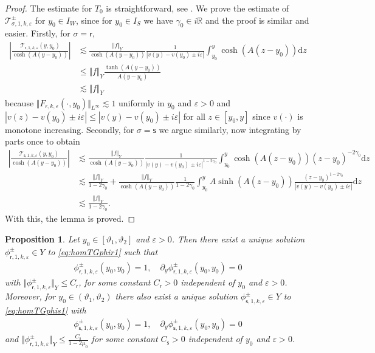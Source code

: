 \documentclass[11pt,reqno]{amsproc}
\newtheorem{proposition}{Proposition}[section]
\theoremstyle{definition}
\numberwithin{equation}{section}
\newcommand{\R}{{\mathbb R}}
\newcommand{\sr}{{\mathsf{r}}}
\newcommand{\s}{{\mathsf{s}}}
\newcommand{\cT}{{\mathcal T}}
\renewcommand{\d}{\mathrm{d}}
\newcommand{\ep}{\varepsilon}
\begin{document}
\begin{proof}
The estimate for $T_0$ is straightforward, see \cite{WZZ18}. We prove the estimate of $\cT_{\sigma,1,k,\ep}^\pm$ for $y_0\in I_W$, since for $y_0\in I_S$ we have $\gamma_0\in i\R$ and the proof is similar and easier. Firstly, for $\sigma = \sr$,
\begin{align*}
\left| \frac{\cT_{\sr,1,k,\ep}(y,y_0) }{\cosh(A(y-y_0))}\right| &\lesssim \frac{\Vert f \Vert_Y}{\cosh(A(y-y_0))}\frac{1}{|v(y) - v(y_0) \pm i\ep|}\int_{y_0}^y \cosh(A(z-y_0)) \d z \\
&\leq \Vert f \Vert_{Y}\frac{\tanh (A(y-y_0))}{A(y-y_0)} \\
&\lesssim \Vert f \Vert_Y
\end{align*}
because $\Vert F_{\sr,k,\ep}(\cdot,y_0) \Vert_{L^\infty}\lesssim 1$ uniformly in $y_0$ and $\ep>0$ and $|v(z)-v(y_0) \pm i\ep|\leq |v(y) - v(y_0)\pm i\ep|$ for all $z\in [y_0,y]$ since $v(\cdot)$ is monotone increasing. Secondly, for $\sigma = \s$ we argue similarly, now integrating by parts once to obtain
\begin{align*}
\left| \frac{\cT_{\s,1,k,\ep}(y,y_0) }{\cosh(A(y-y_0))}\right| &\lesssim \frac{\Vert f \Vert_Y}{\cosh(A(y-y_0))}\frac{1}{|v(y)-v(y_0)\pm i\ep|^{1-2\gamma_0}}\int_{y_0}^y\cosh(A(z-y_0)) (z-y_0)^{-2\gamma_0} \d z \\
&\lesssim \frac{\Vert f \Vert_Y}{1-2\gamma_0} + \frac{\Vert f \Vert_Y}{\cosh(A(y-y_0))}\frac{1}{1-2\gamma_0} \int_{y_0}^y A\sinh(A(z-y_0)) \frac{(z-y_0)^{1-2\gamma_0}}{|v(y) - v(y_0) \pm i\ep|}\d z \\
&\lesssim \frac{\Vert f \Vert_Y}{1-2\gamma_0}.
\end{align*}
With this, the lemma is proved.
\end{proof}

\begin{proposition}\label{prop:existencesolphisigma}
Let $y_0\in [\vartheta_1,\vartheta_2]$ and $\ep>0$. Then there exist a unique solution $\phi_{\sr,1,k,\ep}^\pm\in Y$ to \eqref{eq:homTGphir1}  such that
\begin{align*}
\phi_{\sr,1,k,\ep}^\pm(y_0,y_0) = 1, \quad \partial_y\phi_{\sr,1,k,\ep}^\pm(y_0,y_0) = 0
\end{align*}
with $\Vert \phi_{\sr,1,k,\ep}^\pm \Vert_Y \leq C_{\sr}$, for some constant $C_{\sr}>0$ independent of $y_0$ and $\ep>0$.  Moreover, for $y_0\in (\vartheta_1,\vartheta_2)$ there also exist a unique solution $\phi_{\s,1,k,\ep}^\pm\in Y$ to \eqref{eq:homTGphis1} with 
\begin{align*}
\phi_{\s,1,k,\ep}^\pm(y_0,y_0) = 1, \quad \partial_y\phi_{\s,1,k,\ep}^\pm(y_0,y_0) = 0
\end{align*}
and $\Vert \phi_{\sr,1,k,\ep}^\pm \Vert_Y \leq \frac{C_{\s}}{1-2\mu_0}$ for some constant $C_\s>0$ independent of $y_0$ and $\ep>0$. 
\end{proposition}
\end{document}
